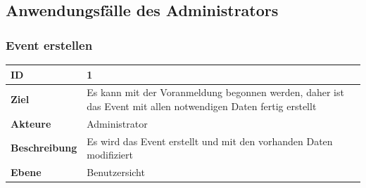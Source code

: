 \documentclass[11pt]{article}
\begin{document}
\subsection{Anwendungsfälle des Administrators}

\subsubsection{Event erstellen}

\begin{tabularx}{\textwidth}{| p{} | p{} |}
	\hline 
	\textbf{ID} & 1 \\
	\hline
	\textbf{Ziel} & Es kann mit der Voranmeldung begonnen werden, daher ist das Event mit allen notwendigen Daten fertig erstellt \\
	\hline
	\textbf{Akteure} & Administrator \\
	\hline
	\textbf{Beschreibung} & Es wird das Event erstellt und mit den vorhanden Daten modifiziert \\
	\hline
	\textbf{Ebene} & Benutzersicht \\


\end{tabularx}
\end{document}
